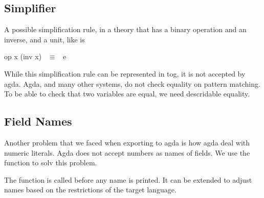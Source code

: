 \subsection{Simplifier}
A possible simplification rule, in a theory that has a binary operation and an inverse, and a unit, like  is  
\begin{agdacode}
op x (inv x) ~$\equiv$~ e 
\end{agdacode}
While this simplification rule can be represented in tog, it is not accepted by agda. Agda, and many other systems, do not check equality on pattern matching. To be able to check that two variables are equal, we need descridable equality.

\subsection{Field Names}
Another problem that we faced when exporting to agda is how agda deal with numeric literals. Agda does not accept numbers as names of fields. We use the function  to solv this problem. 
The function  is called before any name is printed. It can be extended to adjust names based on the restrictions of the target language. 

